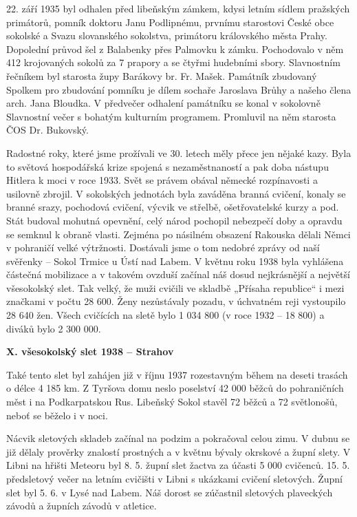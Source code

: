 22. září 1935 byl odhalen před libeňským zámkem, kdysi letním sídlem
pražských primátorů, pomník doktoru Janu Podlipnému, prvnímu starostovi
České obce sokolské a Svazu slovanského sokolstva, primátoru královského
města Prahy. Dopolední průvod šel z Balabenky přes Palmovku k zámku.
Pochodovalo v něm 412 krojovaných sokolů za 7 prapory a se čtyřmi
hudebními sbory. Slavnostním řečníkem byl starosta župy Barákovy br. Fr.
Mašek. Památník zbudovaný Spolkem pro zbudování pomníku je dílem sochaře
Jaroslava Brůhy a našeho člena arch. Jana Bloudka. V předvečer odhalení
památníku se konal v sokolovně Slavnostní večer s bohatým kulturním
programem. Promluvil na něm starosta ČOS Dr. Bukovský.

Radostné roky, které jsme prožívali ve 30. letech měly přece jen nějaké
kazy. Byla to světová hospodářská krize spojená s nezaměstnaností a pak
doba nástupu Hitlera k moci v roce 1933. Svět se právem obával německé
rozpínavosti a usilovně zbrojil. V sokolských jednotách byla zaváděna
branná cvičení, konaly se branné srazy, pochodová cvičení, výcvik ve
střelbě, ošetřovatelské kurzy a pod. Stát budoval mohutná opevnění, celý
národ pochopil nebezpečí doby a opravdu se semknul k obraně vlasti.
Zejména po násilném obsazení Rakouska dělali Němci v pohraničí velké
výtržnosti. Dostávali jsme o tom nedobré zprávy od naší svěřenky --
Sokol Trmice u Ústí nad Labem. V květnu roku 1938 byla vyhlášena
částečná mobilizace a v takovém ovzduší začínal náš dosud nejkrásnější a
největší všesokolský slet. Tak velký, že muži cvičili ve skladbě
„Přísaha republice`` i mezi značkami v počtu 28 600. Ženy nezůstávaly
pozadu, v úchvatném reji vystoupilo 28 640 žen. Všech cvičících na sletě
bylo 1 034 800 (v roce 1932 -- 18 800) a diváků bylo 2 300 000.

\textbf{X. všesokolský slet 1938 -- Strahov}

Také tento slet byl zahájen již v říjnu 1937 rozestavným během na deseti
trasách o délce 4 185 km. Z Tyršova domu neslo poselství 42 000 běžců do
pohraničních měst i na Podkarpatskou Rus. Libeňský Sokol stavěl 72 běžců
a 72 světlonošů, neboť se běželo i v noci.

Nácvik sletových skladeb začínal na podzim a pokračoval celou zimu. V
dubnu se již dělaly prověrky znalostí prostných a v květnu bývaly
okrskové a župní slety. V Libni na hřišti Meteoru byl 8. 5. župní slet
žactva za účasti 5 000 cvičenců. 15. 5. předsletový večer na letním
cvičišti v Libni s ukázkami cvičení sletových. Župní slet byl 5. 6. v
Lysé nad Labem. Náš dorost se zúčastnil sletových plaveckých závodů a
župních závodů v atletice.

